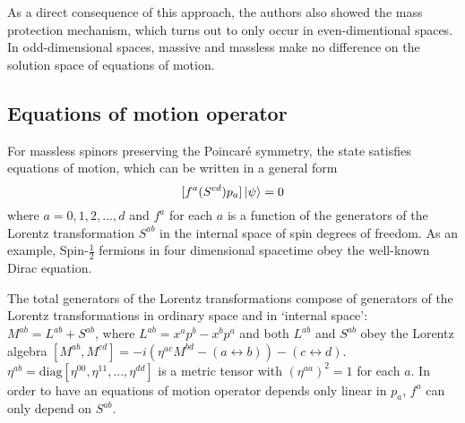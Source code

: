 \documentclass[%
 reprint,
groupedaddress,
showpacs,
 amsmath,amssymb,
 aps,
prb,
]{revtex4-1}
\begin{document}
As a direct consequence of this approach, the authors also showed the mass protection mechanism, which turns out to only occur in even-dimentional spaces. In odd-dimensional spaces, massive and massless make no difference on the solution space of equations of motion.


\subsection{Equations of motion operator} %
\label{sub:equations_of_motion_operator}

For massless spinors preserving the Poincar\'e symmetry, the state satisfies equations of motion, which can be written in a general form
\begin{equation}
	\label{eqn:EOM}
	[f^a (S^{cd}) p_a ]\ket{\psi} = 0
\end{equation}
where $a = 0,1,2,...,d $ and $ f^a $ for each $a$ is a function of the generators of the Lorentz transformation $ S^{ab} $ in the internal space of spin degrees of freedom. As an example, Spin-$ \frac{1}{2} $ fermions in four dimensional spacetime obey the well-known Dirac equation.

The total generators of the Lorentz transformations compose of generators of the Lorentz transformations in ordinary space and in `internal space': $ M^{ab} = L^{ab} + S^{ab} $, where $ L^{ab} =x^ap^b-x^bp^a $ and both $ L^{ab} $ and  $ S^{ab} $ obey the Lorentz algebra $ [M^{ab} ,M^{cd} ] = -i \left ( \eta^{ac} M^{bd} - ( a \leftrightarrow b ) \right ) - (c \leftrightarrow d) $. $ \eta^{ab} = \mathrm{diag} [ \eta^{00}, \eta^{11},..., \eta^{dd} ] $ is a metric tensor with $ (\eta^{aa})^2 = 1 $ for each $a$. In order to have an equations of motion operator depends only linear in $ p_a $, $f^a$ can only depend on $S^{ab} $.
\end{document}

